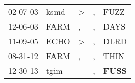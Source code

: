 \begin{supertabular}{p{0.07\textwidth}p{0.06\textwidth}p{0.02\textwidth}p{0.02\textwidth}p{0.06\textwidth}}
 02-07-03\textsuperscript{} &  ksmd\textsuperscript{} &  \textgreater &  , &           FUZZ\textsuperscript{} \\
 12-06-03\textsuperscript{} &  FARM\textsuperscript{} &             , &  , &           DAYS\textsuperscript{} \\
 11-09-05\textsuperscript{} &  ECHO\textsuperscript{} &  \textgreater &  , &           DLRD\textsuperscript{} \\
 08-31-12\textsuperscript{} &  FARM\textsuperscript{} &             , &  , &           THIN\textsuperscript{} \\
 12-30-13\textsuperscript{} &  tgim\textsuperscript{} &               &  , &  \textbf{FUSS\textsuperscript{}} \\
\end{supertabular}
